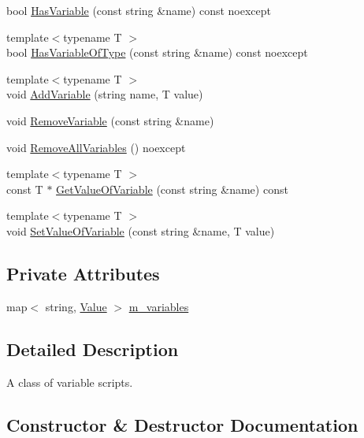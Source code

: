 \begin{DoxyCompactItemize}
\item 
bool \hyperlink{classmage_1_1_variable_script_a777430f641224bf217c958ef4ecde129}{Has\+Variable} (const string \&name) const noexcept
\item 
{\footnotesize template$<$typename T $>$ }\\bool \hyperlink{classmage_1_1_variable_script_af7eecc9edce0f8f9c91c4a1f631e8f69}{Has\+Variable\+Of\+Type} (const string \&name) const noexcept
\item 
{\footnotesize template$<$typename T $>$ }\\void \hyperlink{classmage_1_1_variable_script_a8a676376c1d4a3e4eddd43dcf38763ed}{Add\+Variable} (string name, T value)
\item 
void \hyperlink{classmage_1_1_variable_script_a4970ef4faafb1a6a43c4648ec9f36cce}{Remove\+Variable} (const string \&name)
\item 
void \hyperlink{classmage_1_1_variable_script_af83059a4ce77ebd1ae042707d0acf750}{Remove\+All\+Variables} () noexcept
\item 
{\footnotesize template$<$typename T $>$ }\\const T $\ast$ \hyperlink{classmage_1_1_variable_script_a231b83e1e32b882489ed90faa69f7137}{Get\+Value\+Of\+Variable} (const string \&name) const
\item 
{\footnotesize template$<$typename T $>$ }\\void \hyperlink{classmage_1_1_variable_script_a3a006a5e30f0aae36503d560479511b5}{Set\+Value\+Of\+Variable} (const string \&name, T value)
\end{DoxyCompactItemize}
\subsection*{Private Attributes}
\begin{DoxyCompactItemize}
\item 
map$<$ string, \hyperlink{namespacemage_aa1fe0628487e0706e44efdc62dbdb3a2}{Value} $>$ \hyperlink{classmage_1_1_variable_script_aabab088b19b70f7f0f23f8427bdba51c}{m\+\_\+variables}
\end{DoxyCompactItemize}


\subsection{Detailed Description}
A class of variable scripts. 

\subsection{Constructor \& Destructor Documentation}
\hypertarget{classmage_1_1_variable_script_a87830f09a97aa8f7df3074029c5ab8d5}{}\label{classmage_1_1_variable_script_a87830f09a97aa8f7df3074029c5ab8d5} 

